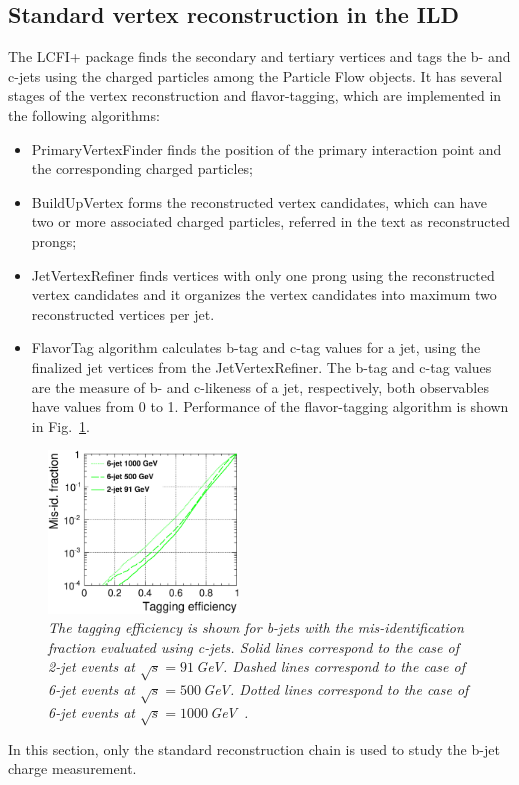 

\subsection{Standard vertex reconstruction in the ILD}
The LCFI+ package finds the secondary and tertiary vertices and tags the b- and c-jets using the charged particles among the Particle Flow objects.
It has several stages of the vertex reconstruction and flavor-tagging, which are implemented in the following algorithms:
\begin{itemize}
\item PrimaryVertexFinder finds the position of the primary interaction point and the corresponding charged particles;
\item BuildUpVertex forms the reconstructed vertex candidates, which can have two or more associated charged particles, referred in the text as reconstructed prongs;
\item JetVertexRefiner finds vertices with only one prong using the reconstructed vertex candidates and it organizes the vertex candidates into maximum two reconstructed vertices per jet.
\item FlavorTag algorithm calculates b-tag and c-tag values for a jet, using the finalized jet vertices from the JetVertexRefiner. The b-tag and c-tag values are the measure of b- and c-likeness of a jet, respectively, both observables have values from 0 to 1. Performance of the flavor-tagging algorithm is shown in Fig.~\ref{fig:LCFIplus_3}.
\end{itemize}

\begin{figure}
	{\centering
		\includegraphics[width=0.45\textwidth]{ILD/graphics/btag-cbg.eps}
		\caption{\sl The tagging efficiency is shown for b-jets with the mis-identification	fraction evaluated using c-jets. Solid lines correspond to the case of 2-jet events at $\sqrt{s} = 91$\,GeV. Dashed lines correspond to the case of 6-jet events at	$\sqrt{s} = 500$\,GeV. Dotted lines correspond to the case of 6-jet events at $\sqrt{s} = 1000$\,GeV~\cite{bib:LCFI}.
		}
		\label{fig:LCFIplus_3}
	}
\end{figure}
In this section, only the standard reconstruction chain is used to study the b-jet charge measurement. 


